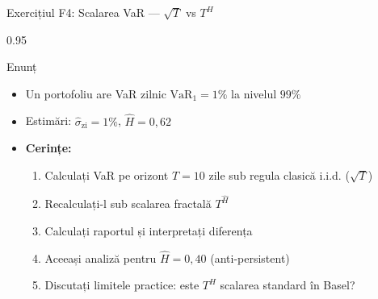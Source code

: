 \documentclass[9pt, aspectratio=169, t]{beamer}
\begin{document}
\begin{frame}[shrink=25]{Exercițiul F4: Scalarea VaR --- $\sqrt T$ vs $T^H$}
\begin{cminipage}{0.95\textwidth}
\begin{block}{Enunț}
\begin{itemize}\setlength{\itemsep}{0pt}
    \item Un portofoliu are VaR zilnic $\text{VaR}_1 = 1\%$ la nivelul $99\%$
    \item Estimări: $\hat\sigma_{\text{zi}} = 1\%$, $\hat H = 0{,}62$
    \item \textbf{Cerințe:}
    \begin{enumerate}\setlength{\itemsep}{0pt}
        \item Calculați VaR pe orizont $T = 10$ zile sub regula clasică i.i.d. ($\sqrt T$)
        \item Recalculați-l sub scalarea fractală $T^{\hat H}$
        \item Calculați raportul și interpretați diferența
        \item Aceeași analiză pentru $\hat H = 0{,}40$ (anti-persistent)
        \item Discutați limitele practice: este $T^H$ scalarea standard în Basel?
    \end{enumerate}
\end{itemize}
\end{block}
\end{cminipage}
\end{frame}
\end{document}
